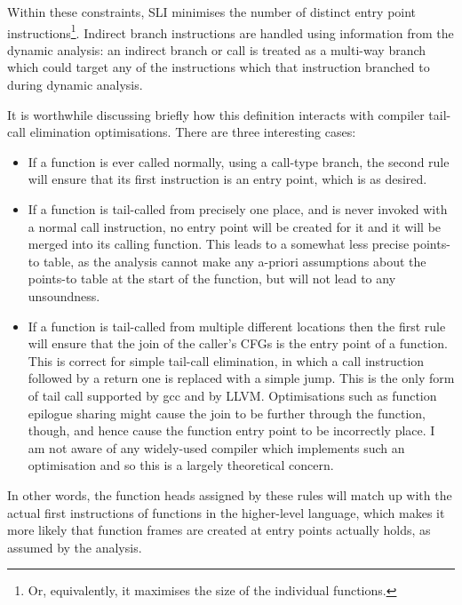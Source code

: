 Within these constraints, SLI minimises the number of distinct entry
point instructions\footnote{Or, equivalently, it maximises the size of
  the individual functions.}.
Indirect branch instructions are handled using information from the
dynamic analysis: an indirect branch or call is treated as a multi-way
branch which could target any of the instructions which that
instruction branched to during dynamic analysis.

It is worthwhile discussing briefly how this definition interacts with
compiler tail-call elimination optimisations.  There are three
interesting cases:

\begin{itemize}
\item
  If a function is ever called normally, using a call-type branch, the
  second rule will ensure that its first instruction is an entry
  point, which is as desired.
\item
  If a function is tail-called from precisely one place, and is never
  invoked with a normal call instruction, no entry point will be
  created for it and it will be merged into its calling function.
  This leads to a somewhat less precise points-to table, as the
  analysis cannot make any a-priori assumptions about the points-to
  table at the start of the function, but will not lead to any
  unsoundness.
\item
  If a function is tail-called from multiple different locations then
  the first rule will ensure that the join of the caller's CFGs is the
  entry point of a function.  This is correct for simple tail-call
  elimination, in which a call instruction followed by a return one is
  replaced with a simple jump.  This is the only form of tail call
  supported by gcc and by LLVM.  Optimisations such as function epilogue
  sharing\needCite{} might cause the join to be further through the
  function, though, and hence cause the function entry point to be
  incorrectly place.  I am not aware of any widely-used compiler which
  implements such an optimisation and so this is a largely theoretical
  concern.
\end{itemize}

In other words, the function heads assigned by these rules will match
up with the actual first instructions of functions in the higher-level
language, which makes it more likely that function frames are created
at entry points actually holds, as assumed by the analysis.

